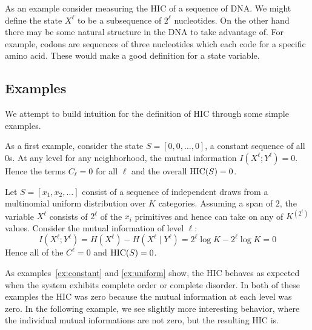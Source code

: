 As an example consider measuring the HIC of a sequence of DNA. We might define
the state $X^\ell$ to be a subsequence of $2^\ell$ nucleotides. On the other
hand there may be some natural structure in the DNA to take advantage of. For
example, codons are sequences of three nucleotides which each code for a
specific amino acid.  These would make a good definition for a state variable.

\subsection{Examples}

We attempt to build intuition for the definition of HIC through some simple
examples.

\begin{example}
  \label{ex:constant}
  As a first example, consider the state $S = [0, 0, \ldots, 0]$,
  a constant sequence of all $0$s. At any level for any neighborhood, the mutual
  information $I(X^\ell; Y^\ell) = 0$. Hence the terms $C_\ell = 0$ for all
  $\ell$ and the overall $\textup{HIC}(S) = 0$.
\end{example}

\begin{example}
  \label{ex:uniform}
  Let $S = [x_1, x_2, \ldots]$ consist of a sequence of independent draws from a
  multinomial uniform distribution over $K$ categories. Assuming a span of $2$,
  the variable $X^\ell$ consists of $2^\ell$ of the $x_i$ primitives and hence
    can take on any of $K^{(2^\ell)}$ values. Consider the mutual information of level
  $\ell$:
  \begin{equation}
    I(X^\ell; Y^\ell) = H(X^\ell) - H(X^\ell \mid Y^{\ell}) = 2^\ell \log K - 2^\ell \log K = 0
  \end{equation}
  Hence all of the $C^\ell = 0$ and $\textup{HIC}(S) = 0$.
\end{example}

As examples~\ref{ex:constant} and \ref{ex:uniform} show, the HIC behaves as
expected when the system exhibits complete order or complete disorder. In both
of these examples the HIC was zero because the mutual information at each level
was zero. In the following example, we see slightly more interesting behavior,
where the individual mutual informations are not zero, but the resulting HIC
is.

